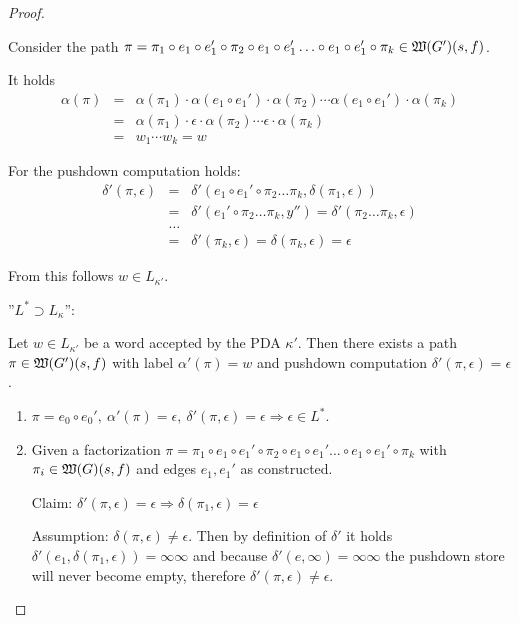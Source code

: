 \begin{proof}
\begin{enumerate}
  Consider the path $\pi = \pi_1 \circ e_1 \circ e_1' \circ \pi_2 \circ e_1
  \circ e_1' \ldots \circ e_1 \circ e_1' \circ \pi_k \in \mbox{$\mathfrak{W}({G'})$}(s,
  f)$.
  
  It holds
  \begin{eqnarray*}
  \alpha(\pi) &=& \alpha(\pi_1) \cdot \alpha(e_1 \circ e_1') \cdot \alpha(\pi_2)
  \cdots \alpha(e_1 \circ e_1') \cdot \alpha(\pi_k) \\
  &=& \alpha(\pi_1) \cdot \epsilon \cdot \alpha(\pi_2) \cdots \epsilon \cdot
  \alpha(\pi_k)  \\
  &=& w_1 \cdots w_k = w
  \end{eqnarray*}
  
  For the pushdown computation holds:
  \begin{eqnarray*}
  \delta'(\pi, \epsilon) &=& \delta'(e_1 \circ e_1' \circ \pi_2 \ldots \pi_k,
  \delta(\pi_1, \epsilon)) \\
  &=& \delta'(e_1' \circ \pi_2 \ldots \pi_k, y'') = \delta'(\pi_2 \ldots \pi_k,
  \epsilon) \\
  &\ldots& \\
  &=& \delta'(\pi_k, \epsilon) = \delta(\pi_k, \epsilon) = \epsilon
  \end{eqnarray*}
 
  From this follows $w \in L_{\kappa'}$.
\end{enumerate} 
 
''$L^* \supset L_{\kappa}$'':

Let $w \in L_{\kappa'}$ be a word accepted by the PDA $\kappa'$. Then there
exists a path $\pi \in \mbox{$\mathfrak{W}({G'})$}(s, f)$ with label $\alpha'(\pi) = w$
and pushdown computation $\delta'(\pi, \epsilon) = \epsilon$.

\begin{enumerate}
  \item $\pi = e_0 \circ e_0',\ \alpha'(\pi) = \epsilon,\ \delta'(\pi, \epsilon)
  = \epsilon \Rightarrow \epsilon \in L^*$.
  
  \item Given a factorization $\pi = \pi_1 \circ e_1 \circ e_1' \circ \pi_2 \circ e_1
  \circ e_1' \ldots \circ e_1 \circ e_1' \circ \pi_k$ with $\pi_i \in
  \mbox{$\mathfrak{W}({G})$}(s, f)$ and edges $e_1, e_1'$ as constructed.
  
  Claim: $\delta'(\pi, \epsilon) = \epsilon \Rightarrow \delta(\pi_1, \epsilon)
  = \epsilon$
  
  Assumption: $\delta(\pi, \epsilon) \neq \epsilon$. Then by definition of
  $\delta'$ it holds $\delta'(e_1, \delta(\pi_1, \epsilon)) = \infty\infty$ and
  because $\delta'(e, \infty) = \infty\infty$ the pushdown store will never
  become empty, therefore $\delta'(\pi, \epsilon) \neq \epsilon$.
  

\end{enumerate}
\end{proof}
